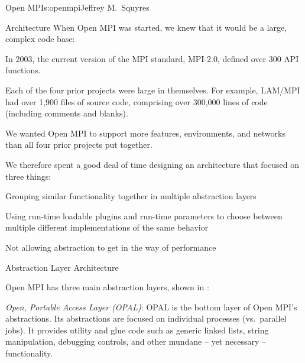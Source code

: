 \begin{aosachapter}{Open MPI}{s:openmpi}{Jeffrey M.\ Squyres}
\begin{aosasect1}{Architecture}
When Open MPI was started, we knew that it would be a large, complex
code base:

\begin{aosaitemize}
\item In 2003, the current version of the MPI standard, MPI-2.0,
  defined over 300 API functions.
\item Each of the four prior projects were large in themselves.  For
  example, LAM/MPI had over 1,900 files of source code, comprising
  over 300,000 lines of code (including comments and blanks).
\item We wanted Open MPI to support more features, environments, and
  networks than all four prior projects put together.
\end{aosaitemize}

We therefore spent a good deal of time designing an architecture that
focused on three things:

\begin{aosaenumerate}
\item Grouping similar functionality together in multiple abstraction
  layers
\item Using run-time loadable plugins and run-time parameters to
  choose between multiple different implementations of the same
  behavior
\item Not allowing abstraction to get in the way of performance
\end{aosaenumerate}


\begin{aosasect2}{Abstraction Layer Architecture}


Open MPI has three main abstraction layers, shown in
:

\begin{aosaitemize}
\item {\em Open, Portable Access Layer (OPAL)}: OPAL is the bottom
  layer of Open MPI's abstractions.  Its abstractions are focused on
  individual processes (vs.\ parallel jobs).  It provides utility and
  glue code such as generic linked lists, string manipulation,
  debugging controls, and other mundane -- yet necessary --
  functionality.


\end{aosaitemize}
\end{aosasect2}
\end{aosasect1}
\end{aosachapter}
